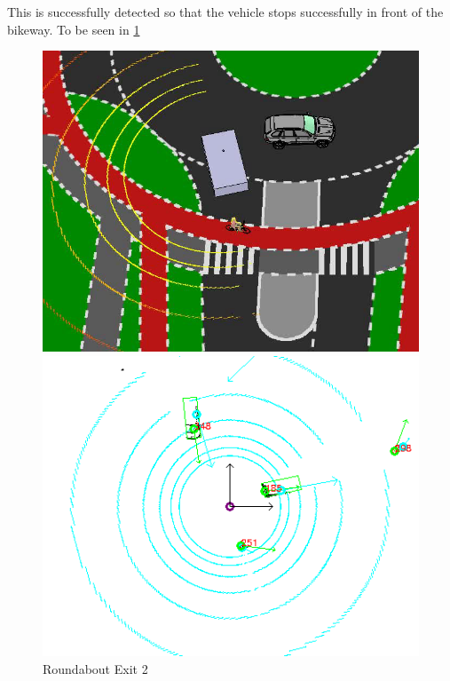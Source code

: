 \documentclass[11pt,oneside,openright]{mpreport}
\begin{document}
This is successfully detected so that the vehicle stops successfully in front of the bikeway. To be seen in \cref{roundabout_exit_2}

\begin{figure}[htb]
  \caption{Roundabout Exit 2} 
    \centering
    \begin{minipage}[t]{0.49\textwidth}
        \centering
          \includegraphics[width=\textwidth]{bilder/sim09.png}
    \end{minipage}%
    \hfill
    \begin{minipage}[t]{0.49\textwidth}
        \centering
	\includegraphics[width=\textwidth]{bilder/sim10.png}
    \end{minipage}
    \label{roundabout_exit_2}
\end{figure}
\end{document}

